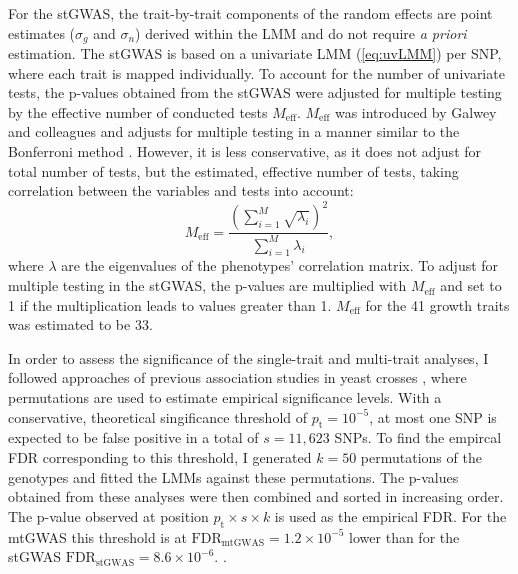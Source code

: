 For the stGWAS, the trait-by-trait components of the random effects are point estimates (\(\sigma_g\) and \(\sigma_n\)) derived within the LMM and do not require \textit{a priori} estimation. The stGWAS is based on a univariate LMM (\cref{eq:uvLMM}) per SNP, where each trait is mapped individually. To account for the number of univariate tests, the p-values obtained from the stGWAS were adjusted for multiple testing by the effective number of conducted tests \(M_\text{eff}\). \(M_\text{eff}\) was introduced by Galwey and colleagues \citeyear{Galwey2009} and adjusts for multiple testing in a manner similar to the Bonferroni method \citep{Dunn1961}. However, it is less conservative, as it does not adjust for total number of tests, but the estimated, effective number of tests, taking correlation between the 
variables and tests into account:
\begin{equation}
 M_\text{eff} = \frac{(\sum^M_{i=1} \sqrt{\lambda_i})^2}{\sum^M_{i=1}\lambda_i},
 \label{eq:meff}
\end{equation}
 where \(\lambda\) are the eigenvalues of the phenotypes' correlation matrix. To adjust for multiple testing in the stGWAS, the p-values are multiplied with \(M_\text{eff}\) and set to \num{1} if the multiplication leads to values greater than \num{1}. \(M_\text{eff}\) for the \num{41} growth traits was estimated to be \num{33}. 
 
In order to assess the significance of the single-trait and multi-trait analyses, I followed approaches of previous association studies in yeast crosses \citep{Brem2002,Brem2005,Ehrenreich2010}, where permutations are used to estimate empirical significance levels. With a conservative, theoretical singificance threshold of \(p_\text{t}=10^{-5}\), at most one SNP is expected to be false positive in a total of \(s = 11,623\) SNPs. To find the empircal FDR corresponding to this threshold, I generated \(k = 50\) permutations of the genotypes and fitted the LMMs against these permutations. The p-values obtained from these analyses were then combined and sorted in increasing order. The p-value observed at position \(p_\text{t} \times s \times k\) is used as the empirical FDR. For the mtGWAS this threshold is at \(\text{FDR}_{\text{mtGWAS}} =1.2 \times 10^{-5}\)  lower than for the stGWAS \(\text{FDR}_{\text{stGWAS}} =8.6 \times 10^{-6}\). .


